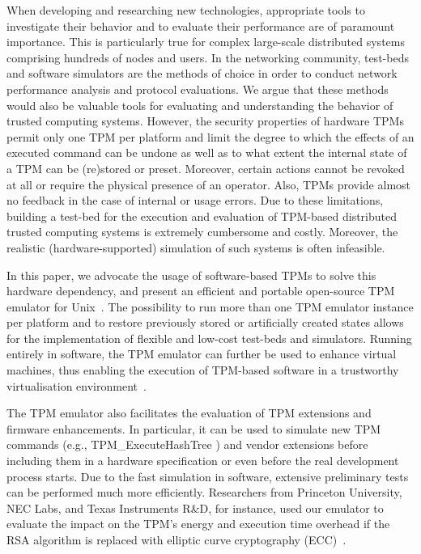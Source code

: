 \documentclass[runningheads]{llncs}
\begin{document}
When developing and researching new technologies, appropriate tools to
investigate their behavior and to evaluate their performance are of paramount
importance. This is particularly true for complex large-scale distributed
systems comprising hundreds of nodes and users.
In the networking community, test-beds and software simulators are the methods
of choice in order to conduct network performance analysis and protocol
evaluations. We argue that these methods would also be valuable tools for
evaluating and understanding the behavior of trusted
computing systems. However, the security properties of hardware TPMs permit
only one TPM per platform and limit the degree to which the effects of an
executed command can be undone as well as to what extent the internal state
of a TPM can be (re)stored or preset. Moreover, certain actions cannot be
revoked at all or require the physical presence of an operator. Also, TPMs
provide almost no feedback in the case of internal or usage errors. Due to
these limitations, building a test-bed for the execution and evaluation of
TPM-based distributed trusted computing systems is extremely cumbersome and
costly. Moreover, the realistic (hardware-supported) simulation of such
systems is often infeasible.

In this paper, we advocate the usage of software-based TPMs to solve this
hardware dependency, and present an efficient and portable open-source TPM
emulator for Unix~\cite{TPMEmu}. The possibility to run more than one TPM
emulator instance per platform and to restore previously stored or
artificially created states allows for the implementation of flexible and
low-cost test-beds and simulators. Running entirely in software,
the TPM emulator can further be used to enhance virtual machines, thus
enabling the execution of TPM-based software in a trustworthy virtualisation
environment~\cite{Xen}.

The TPM emulator also facilitates the evaluation of TPM extensions and
firmware enhancements. In particular, it can be used to simulate new TPM
commands (e.g., \textsf{TPM\_ExecuteHashTree} \cite{Sarmenta})
and vendor extensions before including them in a hardware specification
or even before the real development process starts. Due to the fast
simulation in software, extensive preliminary tests can be performed much
more efficiently.
Researchers from Princeton University, NEC Labs, and Texas Instruments R\&D,
for instance, used our emulator to evaluate the impact on the TPM's energy
and execution time overhead if the RSA algorithm is replaced with elliptic
curve cryptography (ECC)~\cite{Aaraj}.
\end{document}
